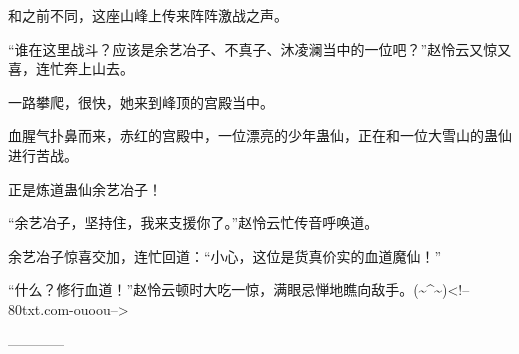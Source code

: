 \begin{this_body}
和之前不同，这座山峰上传来阵阵激战之声。

“谁在这里战斗？应该是余艺冶子、不真子、沐凌澜当中的一位吧？”赵怜云又惊又喜，连忙奔上山去。

一路攀爬，很快，她来到峰顶的宫殿当中。

血腥气扑鼻而来，赤红的宫殿中，一位漂亮的少年蛊仙，正在和一位大雪山的蛊仙进行苦战。

正是炼道蛊仙余艺冶子！

“余艺冶子，坚持住，我来支援你了。”赵怜云忙传音呼唤道。

余艺冶子惊喜交加，连忙回道：“小心，这位是货真价实的血道魔仙！”

“什么？修行血道！”赵怜云顿时大吃一惊，满眼忌惮地瞧向敌手。(\~{}\^{}\~{})<!--80txt.com-ouoou-->

------------

\end{this_body}

